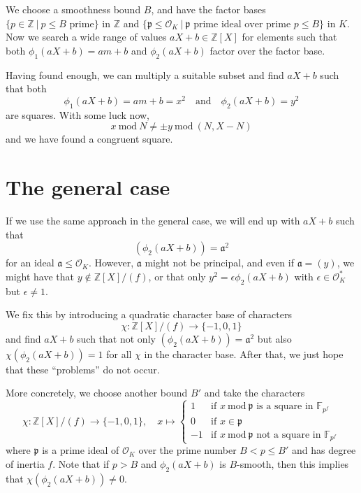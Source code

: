 \documentclass{scrartcl}
\newcommand{\Z}{\mathbb{Z}}
\newcommand{\F}{\mathbb{F}}
\newcommand{\p}{\mathfrak{p}}
\renewcommand{\a}{\mathfrak{a}}
\renewcommand{\O}{\mathcal{O}}
\renewcommand{\mod}{\ \mathrm{mod} \ }
\theoremstyle{definition}
\begin{document}
We choose a smoothness bound $B$, and have the factor bases $\{ p \in \Z \ | \ \text{$p \leq B$ prime} \}$ in $\Z$ and $\{ \p \leq \O_K \ | \ \text{$\p$ prime ideal over prime $p \leq B$} \}$ in $K$.
Now we search a wide range of values $aX + b \in \Z[X]$ for elements such that both $\phi_1(aX + b) = am + b$ and $\phi_2(aX + b)$ factor over the factor base.

Having found enough, we can multiply a suitable subset and find $aX + b$ such that both
\begin{equation*}
    \phi_1(aX + b) = am + b = x^2 \quad \text{and} \quad \phi_2(aX + b) = y^2
\end{equation*}
are squares.
With some luck now,
\begin{equation*}
    x \mod N \neq \pm y \mod (N, X - N)    
\end{equation*}
and we have found a congruent square.

\section{The general case}
If we use the same approach in the general case, we will end up with $aX + b$ such that
\begin{equation*}
    (\phi_2(aX + b)) = \a^2
\end{equation*}
for an ideal $\a \leq \O_K$.
However, $\a$ might not be principal, and even if $\a = (y)$, we might have that $y \notin \Z[X]/(f)$, or that only $y^2 = \epsilon \phi_2(aX + b)$ with $\epsilon \in \O_K^*$ but $\epsilon \neq 1$.

We fix this by introducing a quadratic character base of characters
\begin{equation*}
    \chi: \Z[X]/(f) \to \{ -1, 0, 1 \}
\end{equation*}
and find $aX + b$ such that not only $(\phi_2(aX + b)) = \a^2$ but also $\chi(\phi_2(aX + b)) = 1$ for all $\chi$ in the character base.
After that, we just hope that these ``problems'' do not occur.

More concretely, we choose another bound $B'$ and take the characters
\begin{equation*}
    \chi: \Z[X]/(f) \to \{ -1, 0, 1 \}, \quad x \mapsto \begin{cases}
        1 & \text{if $x \mod \p$ is a square in $\F_{p^f}$} \\
        0 & \text{if $x \in \p$} \\
        -1 & \text{if $x \mod \p$ not a square in $\F_{p^f}$}
    \end{cases}
\end{equation*}
where $\p$ is a prime ideal of $\O_K$ over the prime number $B < p \leq B'$ and has degree of inertia $f$.
Note that if $p > B$ and $\phi_2(aX + b)$ is $B$-smooth, then this implies that $\chi(\phi_2(aX + b)) \neq 0$.
\end{document}

